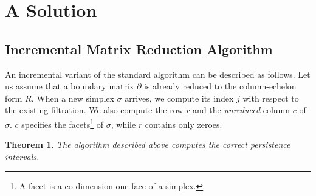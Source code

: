 \documentclass[11pt]{article}
\newtheorem{theorem}{Theorem}[section]
\begin{document}
\section{A Solution}

\subsection{Incremental Matrix Reduction Algorithm}

An incremental variant of the standard algorithm can be described as follows.  Let us assume that a 
boundary matrix $\partial$ is already reduced to the column-echelon form $R$.  When a new simplex 
$\sigma$ arrives, we compute its index $j$ with respect to the existing filtration.  We also 
compute the row $r$ and the \emph{unreduced} column $c$ of $\sigma$. $c$ specifies the 
facets\footnote{A facet is a co-dimension one face of a simplex.} of $\sigma$, while $r$ contains 
only zeroes.

\begin{theorem}
	The algorithm described above computes the correct persistence intervals.
\end{theorem}
\end{document}
